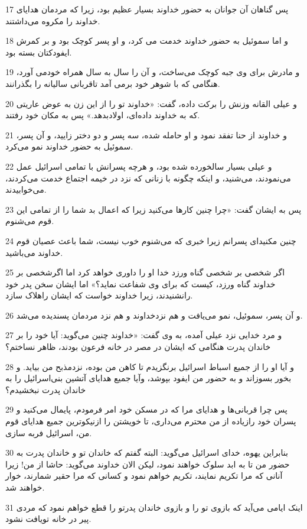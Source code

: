 \par 17 پس گناهان آن جوانان به حضور خداوند بسیار عظیم بود، زیرا که مردمان هدایای خداوند را مکروه می‌داشتند.
\par 18 و اما سموئیل به حضور خداوند خدمت می کرد، و او پسر کوچک بود و بر کمرش ایفودکتان بسته بود.
\par 19 و مادرش برای وی جبه کوچک می‌ساخت، و آن را سال به سال همراه خودمی آورد، هنگامی که با شوهر خود برمی آمد تاقربانی سالیانه را بگذرانند.
\par 20 و عیلی القانه وزنش را برکت داده، گفت: «خداوند تو را از این زن به عوض عاریتی که به خداوند داده‌ای، اولادبدهد.» پس به مکان خود رفتند.
\par 21 و خداوند از حنا تفقد نمود و او حامله شده، سه پسر و دو دختر زایید، و آن پسر، سموئیل به حضور خداوند نمو می‌کرد.
\par 22 و عیلی بسیار سالخورده شده بود، و هر‌چه پسرانش با تمامی اسرائیل عمل می‌نمودند، می‌شنید، و اینکه چگونه با زنانی که نزد در خیمه اجتماع خدمت می‌کردند، می‌خوابیدند.
\par 23 پس به ایشان گفت: «چرا چنین کارها می‌کنید زیرا که اعمال بد شما را از تمامی این قوم می‌شنوم.
\par 24 چنین مکنید‌ای پسرانم زیرا خبری که می‌شنوم خوب نیست، شما باعث عصیان قوم خداوند می‌باشید.
\par 25 اگر شخصی بر شخصی گناه ورزد خدا او را داوری خواهد کرد اما اگرشخصی بر خداوند گناه ورزد، کیست که برای وی شفاعت نماید؟» اما ایشان سخن پدر خود رانشنیدند، زیرا خداوند خواست که ایشان راهلاک سازد.
\par 26 و آن پسر، سموئیل، نمو می‌یافت و هم نزدخداوند و هم نزد مردمان پسندیده می‌شد.
\par 27 و مرد خدایی نزد عیلی آمده، به وی گفت: «خداوند چنین می‌گوید: آیا خود را بر خاندان پدرت هنگامی که ایشان در مصر در خانه فرعون بودند، ظاهر نساختم؟
\par 28 و آیا او را از جمیع اسباط اسرائیل برنگزیدم تا کاهن من بوده، نزدمذبح من بیاید. و بخور بسوزاند و به حضور من ایفود بپوشد، وآیا جمیع هدایای آتشین بنی‌اسرائیل را به خاندان پدرت نبخشیدم؟
\par 29 پس چرا قربانی‌ها و هدایای مرا که در مسکن خود امر فرمودم، پایمال می‌کنید و پسران خود رازیاده از من محترم می‌داری، تا خویشتن را ازنیکوترین جمیع هدایای قوم من، اسرائیل فربه سازی.
\par 30 بنابراین یهوه، خدای اسرائیل می‌گوید: البته گفتم که خاندان تو و خاندان پدرت به حضور من تا به ابد سلوک خواهند نمود، لیکن الان خداوند می‌گوید: حاشا از من! زیرا آنانی که مرا تکریم نمایند، تکریم خواهم نمود و کسانی که مرا حقیر شمارند، خوار خواهند شد.
\par 31 اینک ایامی می‌آید که بازوی تو را و بازوی خاندان پدرتو را قطع خواهم نمود که مردی پیر در خانه تویافت نشود.
